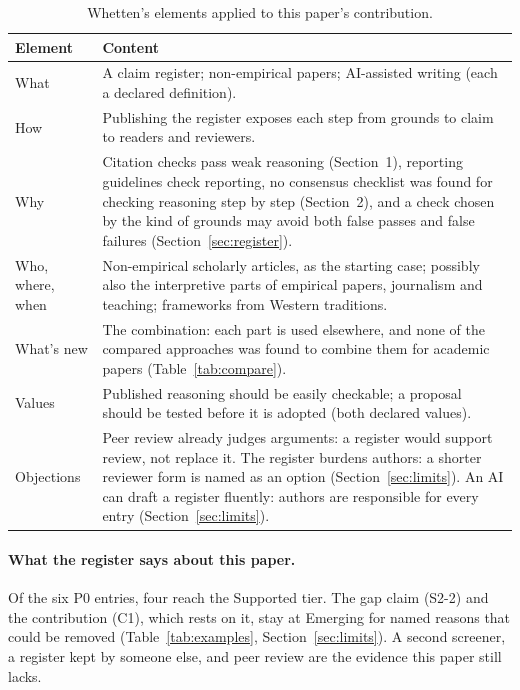 \documentclass[12pt, a4paper]{article}
\begin{document}
\begin{table}[htbp]
\centering
\caption{Whetten's elements applied to this paper's contribution.}
\label{tab:whetten}
\small
\begin{tabular}{@{}lp{11cm}@{}}
\toprule
\textbf{Element} & \textbf{Content} \\
\midrule
What  & A claim register; non-empirical papers; AI-assisted writing (each a declared definition). \\
How   & Publishing the register exposes each step from grounds to claim to readers and reviewers. \\
Why   & Citation checks pass weak reasoning (Section~1), reporting guidelines check reporting, no consensus checklist was found for checking reasoning step by step (Section~2), and a check chosen by the kind of grounds may avoid both false passes and false failures (Section~\ref{sec:register}). \\
Who, where, when & Non-empirical scholarly articles, as the starting case; possibly also the interpretive parts of empirical papers, journalism and teaching; frameworks from Western traditions. \\
What's new & The combination: each part is used elsewhere, and none of the compared approaches was found to combine them for academic papers (Table~\ref{tab:compare}). \\
Values & Published reasoning should be easily checkable; a proposal should be tested before it is adopted (both declared values). \\
Objections & Peer review already judges arguments: a register would support review, not replace it.  The register burdens authors: a shorter reviewer form is named as an option (Section~\ref{sec:limits}).  An AI can draft a register fluently: authors are responsible for every entry (Section~\ref{sec:limits}). \\
\bottomrule
\end{tabular}
\end{table}

\paragraph{What the register says about this paper.}
Of the six P0 entries, four reach the Supported tier.  The gap claim (S2-2) and the contribution (C1), which rests on it, stay at Emerging for named reasons that could be removed (Table~\ref{tab:examples}, Section~\ref{sec:limits}).  A second screener, a register kept by someone else, and
peer review are the evidence this paper still lacks.
\end{document}
